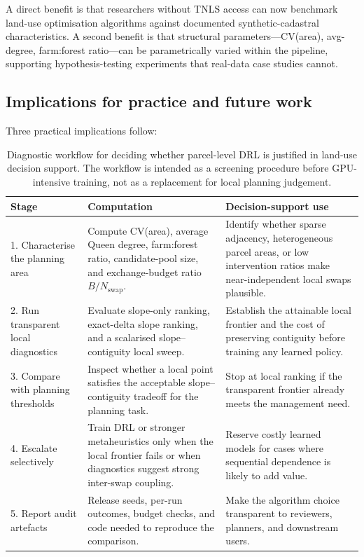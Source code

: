 \documentclass[]{interact}
\theoremstyle{plain}
\begin{document}
A direct benefit is that researchers without TNLS access can now benchmark land-use optimisation algorithms against documented synthetic-cadastral characteristics. A second benefit is that structural parameters---CV(area), avg-degree, farm:forest ratio---can be parametrically varied within the pipeline, supporting hypothesis-testing experiments that real-data case studies cannot.

\subsection{Implications for practice and future work}\label{sec:disc-implications}

Three practical implications follow:

\begin{table}[htbp]
\centering
\caption{Diagnostic workflow for deciding whether parcel-level DRL is justified in land-use decision support. The workflow is intended as a screening procedure before GPU-intensive training, not as a replacement for local planning judgement.}
\label{tab:diagnostic-workflow}
\small
\begin{tabular}{p{}p{}p{}}
\toprule
Stage & Computation & Decision-support use \\
\midrule
1. Characterise the planning area & Compute CV(area), average Queen degree, farm:forest ratio, candidate-pool size, and exchange-budget ratio $B/N_{\text{swap}}$. & Identify whether sparse adjacency, heterogeneous parcel areas, or low intervention ratios make near-independent local swaps plausible. \\
2. Run transparent local diagnostics & Evaluate slope-only ranking, exact-delta slope ranking, and a scalarised slope--contiguity local sweep. & Establish the attainable local frontier and the cost of preserving contiguity before training any learned policy. \\
3. Compare with planning thresholds & Inspect whether a local point satisfies the acceptable slope--contiguity tradeoff for the planning task. & Stop at local ranking if the transparent frontier already meets the management need. \\
4. Escalate selectively & Train DRL or stronger metaheuristics only when the local frontier fails or when diagnostics suggest strong inter-swap coupling. & Reserve costly learned models for cases where sequential dependence is likely to add value. \\
5. Report audit artefacts & Release seeds, per-run outcomes, budget checks, and code needed to reproduce the comparison. & Make the algorithm choice transparent to reviewers, planners, and downstream users. \\
\bottomrule
\end{tabular}
\end{table}
\end{document}
